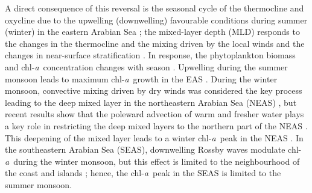 \documentclass[authoryear,review,11pt]{elsarticle}
\newcommand{\chla}{chl-{\emph{a}}}
\begin{document}

A direct consequence of this reversal is the seasonal cycle of the thermocline \citep{shetye1990hydrography, shetye19911517, vijith2022circulation} and oxycline \citep{desousa1996seasonal, schmidt2020seasonal} due to the upwelling (downwelling) favourable conditions during summer (winter) in the eastern Arabian Sea \citep[EAS;][]{shetye1990hydrography, shetye19911517, vijith2022circulation}; the mixed-layer depth (MLD) responds to the changes in the thermocline and the mixing driven by the local winds and the changes in near-surface stratification \citep{shetye19911517, prasad1996mixed, prasannakumara20051848}. In response, the phytoplankton biomass and \chla\ concentration changes with season \citep{subrahmanyan1960studies, banse1968hydrography, prasannakumara20051848, levy2007basin, mccreary2009biophysical, vijith2016consequences, shankar2019role}. Upwelling during the summer monsoon leads to maximum \chla\ growth in the EAS \citep{banse1968hydrography, banse2000geographical, mccreary2009biophysical, hood2017biogeochemical, bemal2018picophytoplankton, shi2022phytoplankton}. During the winter monsoon, convective mixing driven by dry winds was considered the key process leading to the deep mixed layer in the northeastern Arabian Sea (NEAS) \citep{banse1968hydrography, shetye1992does, madhupratap1996mechanism, mccreary1996four, levy2007basin}, but recent results show that the poleward advection of warm and fresher water plays a key role in restricting the deep mixed layers to the northern part of the NEAS \citep{shankar2016inhibition}.  This deepening of the mixed layer leads to a winter \chla\ peak in the NEAS \citep{madhupratap1996mechanism, mccreary1996four, levy2007basin, shankar2016inhibition, vijith2016consequences, keerthi2017physical, shi2022phytoplankton}. In the southeastern Arabian Sea (SEAS), downwelling Rossby waves modulate \chla\ during the winter monsoon, but this effect is limited to the neighbourhood of the coast and islands \citep{amol2020modulation}; hence, the \chla\ peak in the SEAS is limited to the summer monsoon. 
\end{document}
